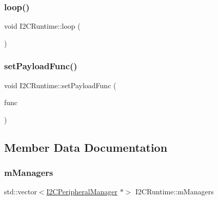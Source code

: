 \mbox{\label{class_i2_c_runtime_a7fd85af000f8d514f94c2f92db1ddfaa}} 
\subsubsection{\texorpdfstring{loop()}{loop()}}
{\footnotesize\ttfamily void I2\+C\+Runtime\+::loop (\begin{DoxyParamCaption}{ }\end{DoxyParamCaption})}

\mbox{\label{class_i2_c_runtime_a1ce8a62c677e64e8113376fc1264c6e6}} 
\subsubsection{\texorpdfstring{set\+Payload\+Func()}{setPayloadFunc()}}
{\footnotesize\ttfamily void I2\+C\+Runtime\+::set\+Payload\+Func (\begin{DoxyParamCaption}\item[{std\+::shared\+\_\+ptr$<$ \mbox{\hyperlink{_telemetry_protocol_8h_a98c05796bd59110e8ae10dc71580b759}{Payload\+Func}} $>$}]{func }\end{DoxyParamCaption})}



\subsection{Member Data Documentation}
\mbox{\label{class_i2_c_runtime_a399a771421014539f95a53e58debc341}} 
\subsubsection{\texorpdfstring{m\+Managers}{mManagers}}
{\footnotesize\ttfamily std\+::vector$<$\mbox{\hyperlink{class_i2_c_peripheral_manager}{I2\+C\+Peripheral\+Manager}} $\ast$$>$ I2\+C\+Runtime\+::m\+Managers\hspace{0.3cm}{\ttfamily [private]}}

